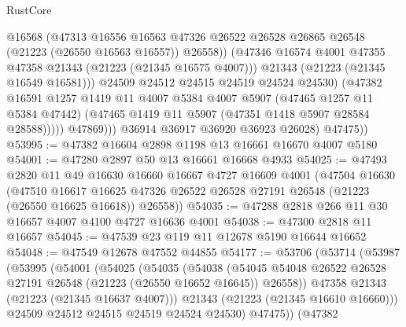 \begin{lexlean}{RustCore}
\begin{coremodule}
                          @16568
                          (@47313
                            @16556
                            @16563
                            @47326
                            @26522
                            @26528
                            @26865
                            @26548
                            (@21223 (@26550 @16563 @16557))
                            @26558))
                        (@47346 @16574 @4001 @47355 @47358 @21343 (@21223 (@21345 @16575 @4007)))
                        @21343
                        (@21223 (@21345 @16549 @16581)))
                      @24509
                      @24512
                      @24515
                      @24519
                      @24524
                      @24530)
                    (@47382
                      @16591
                      @1257
                      @1419
                      @11
                      @4007
                      @5384
                      @4007
                      @5907
                      (@47465 @1257 @11 @5384 @47442)
                      (@47465 @1419 @11 @5907 (@47351 @1418 @5907 @28584 @28588)))))
                @47869)))
          @36914
          @36917
          @36920
          @36923
          @26028)
        @47475))
@53995 := @47382 @16604 @2898 @1198 @13 @16661 @16670 @4007 @5180
@54001 := @47280 @2897 @50 @13 @16661 @16668 @4933
@54025 := @47493
    @2820
    @11
    @49
    @16630
    @16660
    @16667
    @4727
    @16609
    @4001
    (@47504
      @16630
      (@47510
        @16617
        @16625
        @47326
        @26522
        @26528
        @27191
        @26548
        (@21223 (@26550 @16625 @16618))
        @26558))
@54035 := @47288 @2818 @266 @11 @30 @16657 @4007 @4100 @4727 @16636 @4001
@54038 := @47300 @2818 @11 @16657
@54045 := @47539 @23 @119 @11 @12678 @5190 @16644 @16652
@54048 := @47549 @12678 @47552 @44855
@54177 := @53706
    (@53714
      (@53987
        (@53995
          (@54001
            (@54025
              (@54035
                (@54038
                  (@54045
                    @54048
                    @26522
                    @26528
                    @27191
                    @26548
                    (@21223 (@26550 @16652 @16645))
                    @26558))
                @47358
                @21343
                (@21223 (@21345 @16637 @4007)))
              @21343
              (@21223 (@21345 @16610 @16660)))
            @24509
            @24512
            @24515
            @24519
            @24524
            @24530)
          @47475))
      (@47382

\end{coremodule}
\end{lexlean}
